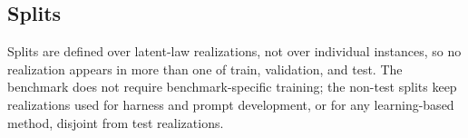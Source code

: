 \subsection{Splits}

Splits are defined over latent-law realizations, not over individual instances, so no realization appears in more than one of train, validation, and test. The benchmark does not require benchmark-specific training; the non-test splits keep realizations used for harness and prompt development, or for any learning-based method, disjoint from test realizations. 

